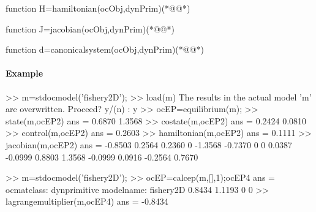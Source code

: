\begin{matlab}
function H=hamiltonian(ocObj,dynPrim)(*@@*)
%
% 
\end{matlab}
\begin{matlab}
function J=jacobian(ocObj,dynPrim)(*@@*)
%
% 
\end{matlab}
\begin{matlab}
function d=canonicalsystem(ocObj,dynPrim)(*@@*)
%
%
\end{matlab}
\paragraph{Example}
\begin{matlab}
>> m=stdocmodel('fishery2D');
>> load(m)
The results in the actual model 'm' are overwritten. Proceed? y/(n) : y
>> ocEP=equilibrium(m);
>> state(m,ocEP{2})
ans =
    0.6870
    1.3568
>> costate(m,ocEP{2})
ans =
    0.2424
    0.0810
>> control(m,ocEP{2})
ans =
    0.2603
>> hamiltonian(m,ocEP{2})
ans =
    0.1111
>> jacobian(m,ocEP{2})
ans =
   -0.8503    0.2564    0.2360         0
   -1.3568   -0.7370         0         0
    0.0387   -0.0999    0.8803    1.3568
   -0.0999    0.0916   -0.2564    0.7670

>> m=stdocmodel('fishery2D');
>> ocEP=calcep(m,[],1);ocEP{4}
ans =
ocmatclass: dynprimitive
modelname: fishery2D
    0.8434
    1.1193
         0
         0
>> lagrangemultiplier(m,ocEP{4})
ans =
   -0.8434
\end{matlab}


